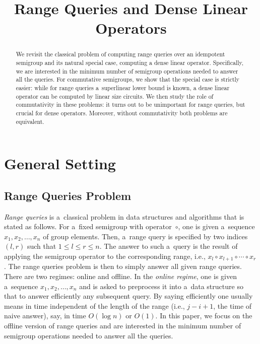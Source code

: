 \documentclass[11pt,letterpaper]{article}
\begin{document}
\author{}
\title{Range Queries and Dense Linear Operators}
\maketitle


\begin{abstract}
We revisit the classical problem of computing range queries over an idempotent semigroup and its natural special case, computing a dense linear operator. Specifically, we are interested in the minimum number of semigroup operations needed to answer all the queries. For commutative semigroups, we show that the special case is strictly easier: while for range queries a~superlinear lower bound is known, a dense linear operator can be computed by linear size circuits. We then study the role of commutativity in these problems: it turns out to be unimportant for range queries, but crucial for dense operators. Moreover, without commutativity both problems are equivalent.
\end{abstract}

\tableofcontents

\section{General Setting}
\subsection{Range Queries Problem}
{\em Range queries} is a~classical problem in data structures and algorithms that is stated as follows. For a~fixed semigroup with operator~$\circ$, one is given a~sequence $x_1, x_2, \dotsc, x_n$ of group elements. Then, a~range query is specified by two indices $(l,r)$ such that $1 \le l \le r \le n$. The answer to such a~query is the result of applying the semigroup operator to the corresponding range, i.e., $x_l \circ x_{l+1} \circ \dotsb \circ x_r$. The range queries problem is then to simply answer all given range queries. There are two regimes: online and offline. In the {\em online regime}, one is given a~sequence $x_1, x_2, \dotsc, x_n$ and is asked to preprocess it into a~data structure so that to answer efficiently any subsequent query. By saying efficiently one usually means in time independent of the length of the range (i.e., $j-i+1$, the time of naive answer), say, in time $O(\log n)$ or $O(1)$. In this paper, we focus on the offline version of range queries and are interested in the minimum number of semigroup operations needed to answer all the queries.
\end{document}
